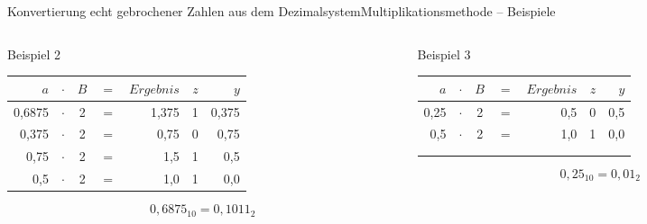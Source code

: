\documentclass[xelatex,aspectratio=169]{beamer}
\begin{document}
\begin{frame}[t]{Konvertierung echt gebrochener Zahlen aus dem Dezimalsystem}{Multiplikationsmethode -- Beispiele}
  \begin{columns}
    \begin{column}{0.5\textwidth}
      \begin{exampleblock}{Beispiel 2}
        \centering
        \begin{tabular}{rcccrrr}
          \toprule
          $a$    & $\cdot$ & $B$ & $=$ & $Ergebnis$ & $z$ & $y$   \\
          \midrule
          0,6875 & $\cdot$ & 2   & $=$ & 1,375      & 1   & 0,375 \\
          0,375  & $\cdot$ & 2   & $=$ & 0,75       & 0   & 0,75  \\
          0,75   & $\cdot$ & 2   & $=$ & 1,5        & 1   & 0,5   \\
          0,5    & $\cdot$ & 2   & $=$ & 1,0        & 1   & 0,0   \\
          \bottomrule
        \end{tabular}
        \[ 0,6875_{10} = 0,1011_{2} \]
      \end{exampleblock}
    \end{column}
    \begin{column}{0.5\textwidth}
      \begin{exampleblock}{Beispiel 3}
        \centering
        \begin{tabular}{rcccrrr}
          \toprule
          $a$  & $\cdot$ & $B$ & $=$ & $Ergebnis$ & $z$ & $y$ \\
          \midrule
          0,25 & $\cdot$ & 2   & $=$ & 0,5        & 0   & 0,5 \\
          0,5  & $\cdot$ & 2   & $=$ & 1,0        & 1   & 0,0 \\
          \bottomrule                                         \\
          \\
        \end{tabular}
        \[ 0,25_{10} = 0,01_{2} \]
      \end{exampleblock}
    \end{column}
  \end{columns}
\end{frame}
\end{document}
